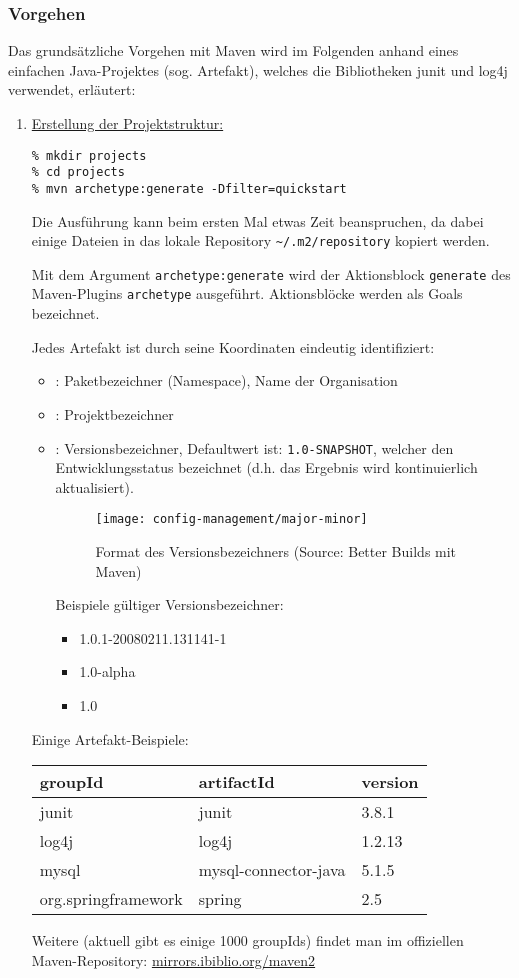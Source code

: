 \subsubsection{Vorgehen}
Das grundsätzliche Vorgehen mit Maven wird im Folgenden anhand eines einfachen
Java-Projektes (sog. Artefakt), welches die Bibliotheken junit und
log4j verwendet, erläutert:
\begin{enumerate}
\item \underline{Erstellung der Projektstruktur:}
  \begin{lstlisting}
% mkdir projects
% cd projects
% mvn archetype:generate -Dfilter=quickstart
  \end{lstlisting}
  Die Ausführung kann beim ersten Mal etwas Zeit beanspruchen,
  da dabei einige Dateien in das lokale
  Repository \verb+~/.m2/repository+ kopiert werden.

  Mit dem Argument \verb+archetype:generate+ wird der Aktionsblock
  \verb+generate+ des Maven-Plugins \verb+archetype+ ausgeführt.
  Aktionsblöcke werden als Goals bezeichnet.

  Jedes Artefakt ist durch seine Koordinaten eindeutig identifiziert:
  \begin{itemize}
  \item {}: Paketbezeichner (Namespace), Name der Organisation
  \item {}: Projektbezeichner
  \item {}: Versionsbezeichner,
    Defaultwert ist: \verb+1.0-SNAPSHOT+, welcher den
  Entwicklungsstatus bezeichnet (d.h. das Ergebnis wird kontinuierlich
  aktualisiert).
  \begin{figure}[H]
  \begin{center}
  \texttt{[image: config-management/major-minor]}
  \end{center}
  \caption{Format des Versionsbezeichners (Source: Better Builds mit Maven)}
  \end{figure}
\newslide
Beispiele gültiger Versionsbezeichner:
  \begin{itemize}
  \item 1.0.1-20080211.131141-1
  \item 1.0-alpha
  \item 1.0
  \end{itemize}
  \end{itemize}
  Einige Artefakt-Beispiele:
\begin{center}
\begin{tabular}{lll}
groupId & artifactId & version\\
\hline
junit  & junit & 3.8.1\\
log4j & log4j & 1.2.13\\
mysql & mysql-connector-java & 5.1.5\\
org.springframework & spring & 2.5\\
\end{tabular}
\end{center}
Weitere (aktuell gibt es einige 1000 groupIds) findet man im
offiziellen Maven-Repository:
\href{http://mirrors.ibiblio.org/maven2}{mirrors.ibiblio.org/maven2}


\end{enumerate}
